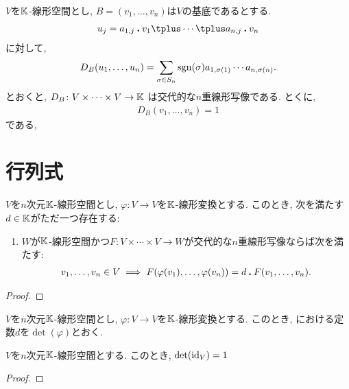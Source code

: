 \begin{example}
  $V$を$\mathbb{K}$-線形空間とし,
  $B=(v_1,\ldots,v_n)$は$V$の基底であるとする.
  \begin{align*}
    u_j= a_{1,j}\act v_1\plus \cdots \plus a_{n,j}\act v_n
  \end{align*}
  に対して,
  \begin{align*}
    D_B(u_{1},\ldots,u_{n})
    =
    \sum_{\sigma\in S_n} \operatorname{sgn}(\sigma)a_{1,\sigma(1)}\cdots a_{n,\sigma(n)}.
  \end{align*}
  とおくと, $D_B\colon V\times \cdots \times V \to \mathbb{K}$
  は交代的な$n$重線形写像である.
  とくに,
  \begin{align*}
    D_B(v_{1},\ldots,v_{n})=1
  \end{align*}
  である,
\end{example}

\section{行列式}

\begin{prop}
  \label{thm:universalprop:det}
  $V$を$n$次元$\mathbb{K}$-線形空間とし,
  $\varphi\colon V \to V$を$\mathbb{K}$-線形変換とする.
  このとき, 次を満たす$d\in\mathbb{K}$がただ一つ存在する:
  \begin{enumerate}
  \item $W$が$\mathbb{K}$-線形空間かつ$F\colon V\times\cdots \times V\to W$が交代的な$n$重線形写像ならば次を満たす:
    \begin{align*}
      v_1,\ldots, v_n \in V\implies F(\varphi(v_1),\ldots,\varphi(v_n))=d \mathbin{\boldsymbol{.}} F(v_1,\ldots,v_n).
    \end{align*}
  \end{enumerate}
\end{prop}
\begin{proof}\end{proof}

\begin{definition}
  $V$を$n$次元$\mathbb{K}$-線形空間とし,
  $\varphi\colon V \to V$を$\mathbb{K}$-線形変換とする.
  このとき,
  における定数$d$を$\det(\varphi)$とおく.
\end{definition}

\begin{prop}
  $V$を$n$次元$\mathbb{K}$-線形空間とする.
  このとき, $\det(\operatorname{id}_V)=1$
\end{prop}
\begin{proof}\end{proof}

